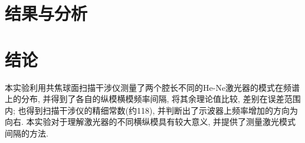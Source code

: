 \documentclass[aps,pre,12pt,preprint,%
	onecolumn,showpacs,showkeys,nofootinbib]{revtex4-2}
\begin{document}
\section{结果与分析}
%	
%	

\section{结论}
本实验利用共焦球面扫描干涉仪测量了两个腔长不同的He-Ne激光器的模式在频谱上的分布, 并得到了各自的纵模横模频率间隔, 将其余理论值比较, 差别在误差范围内; 也得到扫描干涉仪的精细常数(约118), 并判断出了示波器上频率增加的方向为向右. 本实验对于理解激光器的不同横纵模具有较大意义, 并提供了测量激光模式间隔的方法.
\end{document}
